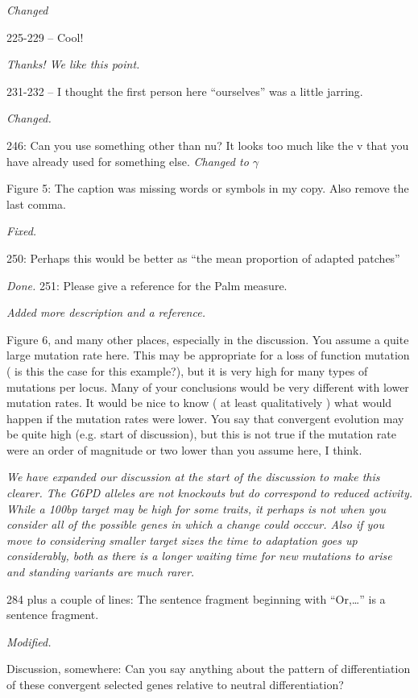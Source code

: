 \documentclass[12pt,letterpaper]{article}
\newcommand{\response}[1]{\emph{ \color{blue} #1}}
\begin{document}
\response{Changed}

225-229 – Cool!

\response{Thanks! We like this point.}

231-232 – I thought the first person here “ourselves” was a little jarring.

\response{Changed.}

246: Can you use something other than nu? It looks too much like the v that you have already used for something else.
\response{Changed to $\gamma$}

Figure 5: The caption was missing words or symbols in my copy. Also remove the last comma.

\response{Fixed.}

250: Perhaps this would be better as “the mean proportion of adapted patches”

\response{Done.}
251: Please give a reference for the Palm measure.

\response{Added more description and a reference.}

Figure 6, and many other places, especially in the discussion. You assume a quite large mutation rate here. This may be appropriate for a loss of function mutation ( is this the case for this example?), but it is very high for many types of mutations per locus. Many of your conclusions would be very different with lower mutation rates. It would be nice to know ( at least qualitatively ) what would happen if the mutation rates were lower. You say that convergent evolution may be quite high (e.g. start of discussion), but this is not true if the mutation rate were an order of magnitude or two lower than you assume here, I think. 

\response{We have expanded our discussion at the start of the discussion to make this clearer. The G6PD alleles are not knockouts but do correspond to reduced activity. While a 100bp target may be high for some traits, it perhaps is not when you consider all of the possible genes in which a change could occcur. Also if you move to considering smaller target sizes the time to adaptation goes up considerably, both as there is a longer waiting time for new mutations to arise and standing variants are much rarer. }


284 plus a couple of lines: The sentence fragment beginning with “Or,…” is a sentence fragment.

\response{Modified.}

Discussion, somewhere: Can you say anything about the pattern of differentiation of these convergent selected genes relative to neutral differentiation? 
\end{document}
